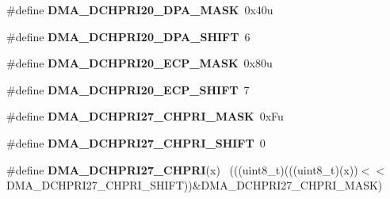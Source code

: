 \begin{DoxyCompactItemize}
\item 
\hypertarget{group___d_m_a___register___masks_gaabe189f346693f26bf185f4e58273c73}{}\#define {\bfseries D\+M\+A\+\_\+\+D\+C\+H\+P\+R\+I20\+\_\+\+D\+P\+A\+\_\+\+M\+A\+S\+K}~0x40u\label{group___d_m_a___register___masks_gaabe189f346693f26bf185f4e58273c73}

\item 
\hypertarget{group___d_m_a___register___masks_ga6f6ce698822cb5a97909045b2f2cf7de}{}\#define {\bfseries D\+M\+A\+\_\+\+D\+C\+H\+P\+R\+I20\+\_\+\+D\+P\+A\+\_\+\+S\+H\+I\+F\+T}~6\label{group___d_m_a___register___masks_ga6f6ce698822cb5a97909045b2f2cf7de}

\item 
\hypertarget{group___d_m_a___register___masks_gaadba858fdbb0961327be929d2effdfa2}{}\#define {\bfseries D\+M\+A\+\_\+\+D\+C\+H\+P\+R\+I20\+\_\+\+E\+C\+P\+\_\+\+M\+A\+S\+K}~0x80u\label{group___d_m_a___register___masks_gaadba858fdbb0961327be929d2effdfa2}

\item 
\hypertarget{group___d_m_a___register___masks_ga1fc9d49f35c900780b9896009da17faa}{}\#define {\bfseries D\+M\+A\+\_\+\+D\+C\+H\+P\+R\+I20\+\_\+\+E\+C\+P\+\_\+\+S\+H\+I\+F\+T}~7\label{group___d_m_a___register___masks_ga1fc9d49f35c900780b9896009da17faa}

\item 
\hypertarget{group___d_m_a___register___masks_ga6598bacec4905b2f036c8e38cb375d88}{}\#define {\bfseries D\+M\+A\+\_\+\+D\+C\+H\+P\+R\+I27\+\_\+\+C\+H\+P\+R\+I\+\_\+\+M\+A\+S\+K}~0x\+Fu\label{group___d_m_a___register___masks_ga6598bacec4905b2f036c8e38cb375d88}

\item 
\hypertarget{group___d_m_a___register___masks_ga633ded5db8e8c78805513b56cdc61d06}{}\#define {\bfseries D\+M\+A\+\_\+\+D\+C\+H\+P\+R\+I27\+\_\+\+C\+H\+P\+R\+I\+\_\+\+S\+H\+I\+F\+T}~0\label{group___d_m_a___register___masks_ga633ded5db8e8c78805513b56cdc61d06}

\item 
\hypertarget{group___d_m_a___register___masks_gaf871d9cc6fa823484ebd549b4b269d61}{}\#define {\bfseries D\+M\+A\+\_\+\+D\+C\+H\+P\+R\+I27\+\_\+\+C\+H\+P\+R\+I}(x)                                    ~(((uint8\+\_\+t)(((uint8\+\_\+t)(x))$<$$<$D\+M\+A\+\_\+\+D\+C\+H\+P\+R\+I27\+\_\+\+C\+H\+P\+R\+I\+\_\+\+S\+H\+I\+F\+T))\&D\+M\+A\+\_\+\+D\+C\+H\+P\+R\+I27\+\_\+\+C\+H\+P\+R\+I\+\_\+\+M\+A\+S\+K)\label{group___d_m_a___register___masks_gaf871d9cc6fa823484ebd549b4b269d61}


\end{DoxyCompactItemize}
